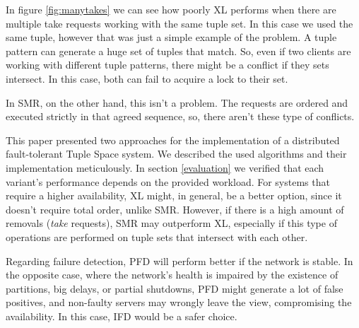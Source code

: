 \documentclass[times, 10pt,twocolumn]{article}
\begin{document}
In figure \ref{fig:manytakes} we can see how poorly XL performs when there are multiple 
take requests working with the same tuple set. In this case we used the same tuple, however that was just
a simple example of the problem. A tuple pattern can generate a huge set of tuples that match. So, even if
two clients are working with different tuple patterns, there might be a conflict if they sets intersect. In this case, both can fail to acquire a lock to their set.

In SMR, on the other hand, this isn't a problem. The requests are ordered and executed strictly in that agreed sequence, so, there aren't these type of conflicts.


 \label{conclusion}
This paper presented two approaches for the implementation of a distributed fault-tolerant Tuple Space system. We
described the used algorithms and their implementation meticulously. In section \ref{evaluation} we verified that each variant's performance depends on the provided workload. 
For systems that require a higher availability, XL might, in general, be a better option, since it doesn't require total order, unlike SMR. 
However, if there is a high amount of removals (\textit{take} requests), SMR may outperform XL, especially if this type of operations are performed on tuple sets that intersect with each other.

Regarding failure detection, PFD will perform better if the network is stable. In the opposite case, where the network's health is impaired by the existence of partitions, big delays, or partial shutdowns, PFD might generate a lot of false positives, and non-faulty servers may wrongly leave the view, compromising the availability. In this case, IFD would be a safer choice.



\end{document}
